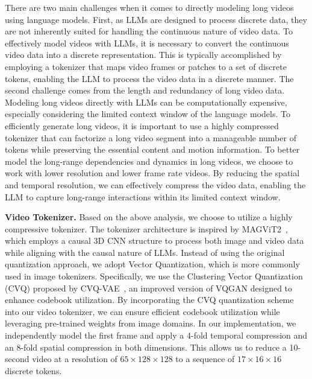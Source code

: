 
There are two main challenges when it comes to directly modeling long videos using language models. First, as LLMs are designed to process discrete data, they are not inherently suited for handling the continuous nature of video data. To effectively model videos with LLMs, it is necessary to convert the continuous video data into a discrete representation. This is typically accomplished by employing a tokenizer that maps video frames or patches to a set of discrete tokens, enabling the LLM to process the video data in a discrete manner. The second challenge comes from the length and redundancy of long video data. Modeling long videos directly with LLMs can be computationally expensive, especially considering the limited context window of the language models. To efficiently generate long videos, it is important to use a highly compressed tokenizer that can factorize a long video segment into a manageable number of tokens while preserving the essential content and motion information. To better model the long-range dependencies and dynamics in long videos, we choose to work with lower resolution and lower frame rate videos. By reducing the spatial and temporal resolution, we can effectively compress the video data, enabling the LLM to capture long-range interactions within its limited context window.


\textbf{Video Tokenizer.} Based on the above analysis, we choose to utilize a highly compressive tokenizer. The tokenizer architecture is inspired by MAGViT2~\cite{yu2023language}, which employs a causal 3D CNN structure to process both image and video data while aligning with the causal nature of LLMs. Instead of using the original quantization approach, we adopt Vector Quantization, which is more commonly used in image tokenizers. Specifically, we use the Clustering Vector Quantization (CVQ) proposed by CVQ-VAE~\cite{Zheng_2023_CVQ}, an improved version of VQGAN\cite{esser2020taming} designed to enhance codebook utilization. By incorporating the CVQ quantization scheme into our video tokenizer, we can ensure efficient codebook utilization while leveraging pre-trained weights from image domains. In our implementation, we independently model the first frame and apply a 4-fold temporal compression and an 8-fold spatial compression in both dimensions. This allows us to reduce a 10-second video at a resolution of $65 \times 128\times 128$ to a sequence of $17\times 16 \times 16$ discrete tokens.

